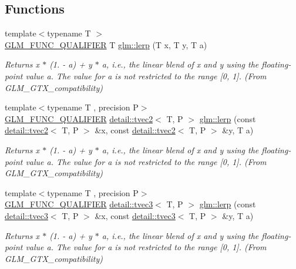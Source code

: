 \subsection*{Functions}
\begin{DoxyCompactItemize}
\item 
{\footnotesize template$<$typename T $>$ }\\\hyperlink{setup_8hpp_a33fdea6f91c5f834105f7415e2a64407}{G\+L\+M\+\_\+\+F\+U\+N\+C\+\_\+\+Q\+U\+A\+L\+I\+F\+I\+ER} T \hyperlink{group__gtx__compatibility_ga5494ba3a95ea6594c86fc75236886864}{glm\+::lerp} (T x, T y, T a)
\begin{DoxyCompactList}\small\item\em Returns x $\ast$ (1. -\/ a) + y $\ast$ a, i.\+e., the linear blend of x and y using the floating-\/point value a. The value for a is not restricted to the range \mbox{[}0, 1\mbox{]}. (From G\+L\+M\+\_\+\+G\+T\+X\+\_\+compatibility) \end{DoxyCompactList}\item 
{\footnotesize template$<$typename T , precision P$>$ }\\\hyperlink{setup_8hpp_a33fdea6f91c5f834105f7415e2a64407}{G\+L\+M\+\_\+\+F\+U\+N\+C\+\_\+\+Q\+U\+A\+L\+I\+F\+I\+ER} \hyperlink{structglm_1_1detail_1_1tvec2}{detail\+::tvec2}$<$ T, P $>$ \hyperlink{group__gtx__compatibility_gad97d71f29fcd1d51a1857a74b67490a0}{glm\+::lerp} (const \hyperlink{structglm_1_1detail_1_1tvec2}{detail\+::tvec2}$<$ T, P $>$ \&x, const \hyperlink{structglm_1_1detail_1_1tvec2}{detail\+::tvec2}$<$ T, P $>$ \&y, T a)
\begin{DoxyCompactList}\small\item\em Returns x $\ast$ (1. -\/ a) + y $\ast$ a, i.\+e., the linear blend of x and y using the floating-\/point value a. The value for a is not restricted to the range \mbox{[}0, 1\mbox{]}. (From G\+L\+M\+\_\+\+G\+T\+X\+\_\+compatibility) \end{DoxyCompactList}\item 
{\footnotesize template$<$typename T , precision P$>$ }\\\hyperlink{setup_8hpp_a33fdea6f91c5f834105f7415e2a64407}{G\+L\+M\+\_\+\+F\+U\+N\+C\+\_\+\+Q\+U\+A\+L\+I\+F\+I\+ER} \hyperlink{structglm_1_1detail_1_1tvec3}{detail\+::tvec3}$<$ T, P $>$ \hyperlink{group__gtx__compatibility_ga5680b8166d1d6a5fa70cbfb56345a5e6}{glm\+::lerp} (const \hyperlink{structglm_1_1detail_1_1tvec3}{detail\+::tvec3}$<$ T, P $>$ \&x, const \hyperlink{structglm_1_1detail_1_1tvec3}{detail\+::tvec3}$<$ T, P $>$ \&y, T a)
\begin{DoxyCompactList}\small\item\em Returns x $\ast$ (1. -\/ a) + y $\ast$ a, i.\+e., the linear blend of x and y using the floating-\/point value a. The value for a is not restricted to the range \mbox{[}0, 1\mbox{]}. (From G\+L\+M\+\_\+\+G\+T\+X\+\_\+compatibility) \end{DoxyCompactList}\item 

\end{DoxyCompactItemize}
